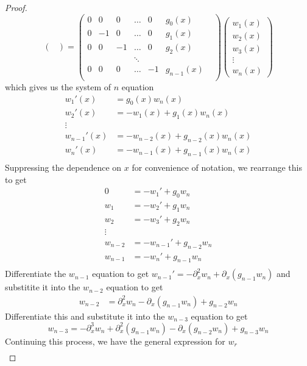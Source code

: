 \documentclass[thesis.tex]{subfiles}
\begin{document}
\begin{lemma}
\begin{proof}
\begin{equation*}
\begin{pmatrix}
\end{pmatrix} = \begin{pmatrix}
0 &  0 & 0  & \dots & 0 & g_0(x) \\
0 & -1 & 0  & \dots & 0 & g_1(x) \\
0 &  0 & -1 & \dots & 0 & g_2(x) \\
& &  & \ddots &  & & \\
0 & 0 & 0 & \dots  & -1 & g_{n-1}(x) \\
\end{pmatrix}
\begin{pmatrix}
w_1(x) \\ w_2(x) \\ w_3(x) \\ \vdots \\ w_n(x)
\end{pmatrix}
\end{equation*}
which gives us the system of $n$ equation 
\begin{align*}
w_1'(x) &= g_0(x) w_n(x) \\
w_2'(x) &= -w_1(x) + g_1(x) w_n(x) \\
\vdots \\
w_{n-1}'(x) &= -w_{n-2}(x) + g_{n-2}(x) w_n(x) \\
w_n'(x) &= -w_{n-1}(x) + g_{n-1}(x) w_n(x) \\
\end{align*}
Suppressing the dependence on $x$ for convenience of notation, we rearrange this to get
\begin{align*}
0 &= -w_1' + g_0 w_n \\
w_1 &= -w_2' + g_1 w_n \\
w_2 &= -w_3' + g_2 w_n \\
\vdots \\
w_{n-2} &= -w_{n-1}' + g_{n-2} w_n \\
w_{n-1} &= -w_n' + g_{n-1} w_n \\
\end{align*}
Differentiate the $w_{n-1}$ equation to get $w_{n-1}' = -\partial_x^2 w_n + \partial_x(g_{n-1}w_n)$ and substitite it into the $w_{n-2}$ equation to get
\begin{align*}
w_{n-2} &= \partial_x^2 w_n - \partial_x(g_{n-1} w_n) + g_{n-2} w_n
\end{align*}
Differentiate this and substitute it into the $w_{n-3}$ equation to get
\[
w_{n-3} = -\partial_x^3 w_n + \partial_x^2(g_{n-1} w_n) - \partial_x(g_{n-2} w_n) + g_{n-3} w_n
\]
Continuing this process, we have the general expression for $w_r$
\begin{align*}

\end{align*}
\end{proof}
\end{lemma}
\end{document}
